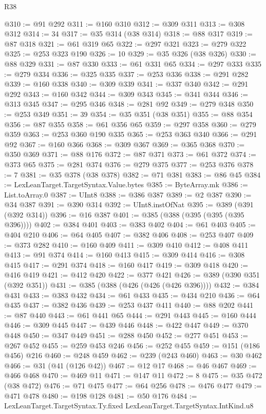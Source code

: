 \begin{lexlean}{R38}
\begin{coremodule}
@310 := @91 @292
@311 := @160 @310
@312 := @309 @311
@313 := @308 @312
@314 := 34
@317 := @35 @314 (@38 @314)
@318 := @88 @317
@319 := @87 @318
@321 := @61 @319 @65
@322 := @297 @321
@323 := @279 @322
@325 := @253 @323 @190
@326 := 10
@329 := @35 @326 (@38 @326)
@330 := @88 @329
@331 := @87 @330
@333 := @61 @331 @65
@334 := @297 @333
@335 := @279 @334
@336 := @325 @335
@337 := @253 @336
@338 := @291 @282
@339 := @160 @338
@340 := @309 @339
@341 := @337 @340
@342 := @291 @292
@343 := @160 @342
@344 := @309 @343
@345 := @341 @344
@346 := @313 @345
@347 := @295 @346
@348 := @281 @92
@349 := @279 @348
@350 := @253 @349
@351 := 39
@354 := @35 @351 (@38 @351)
@355 := @88 @354
@356 := @87 @355
@358 := @61 @356 @65
@359 := @297 @358
@360 := @279 @359
@363 := @253 @360 @190 @335
@365 := @253 @363 @340
@366 := @291 @92
@367 := @160 @366
@368 := @309 @367
@369 := @365 @368
@370 := @350 @369
@371 := @88 @176
@372 := @87 @371
@373 := @61 @372
@374 := @373 @65
@375 := @281 @374
@376 := @279 @375
@377 := @253 @376
@378 := 7
@381 := @35 @378 (@38 @378)
@382 := @71 @381
@383 := @86 @45
@384 := LexLeanTarget.TargetSyntax.Value.bytes
@385 := ByteArray.mk
@386 := List.toArray.{0}
@387 := UInt8
@388 := @386 @387
@389 := @2 @387
@390 := @34 @387
@391 := @390 @314
@392 := UInt8.instOfNat
@395 := @389 (@391 (@392 @314))
@396 := @16 @387
@401 := @385 (@388 (@395 (@395 (@395 @396))))
@402 := @384 @401
@403 := @383 @402
@404 := @61 @403
@405 := @404 @210
@406 := @64 @405
@407 := @382 @406
@408 := @253 @407
@409 := @373 @282
@410 := @160 @409
@411 := @309 @410
@412 := @408 @411
@413 := @91 @374
@414 := @160 @413
@415 := @309 @414
@416 := @308 @415
@417 := @291 @374
@418 := @160 @417
@419 := @309 @418
@420 := @416 @419
@421 := @412 @420
@422 := @377 @421
@426 := @389 (@390 @351 (@392 @351))
@431 := @385 (@388 (@426 (@426 (@426 @396))))
@432 := @384 @431
@433 := @383 @432
@434 := @61 @433
@435 := @434 @210
@436 := @64 @435
@437 := @382 @436
@439 := @253 @437 @411
@440 := @88 @202
@441 := @87 @440
@443 := @61 @441 @65
@444 := @291 @443
@445 := @160 @444
@446 := @309 @445
@447 := @439 @446
@448 := @422 @447
@449 := @370 @448
@450 := @347 @449
@451 := @288 @450
@452 := @277 @451
@453 := @267 @452
@455 := @259 @453 @246
@456 := @252 @455
@459 := @151 (@186 @456) @216
@460 := @248 @459
@462 := @239 (@243 @460)
@463 := @30 @462
@466 := @31 (@41 (@126 @42))
@467 := @12 @17
@468 := @46 @467
@469 := @466 @468
@470 := @469 @11
@471 := @147 @11
@472 := 8
@475 := @35 @472 (@38 @472)
@476 := @71 @475
@477 := @64 @256
@478 := @476 @477
@479 := @471 @478
@480 := @198 @128
@481 := @50 @176
@484 := LexLeanTarget.TargetSyntax.Ty.fixed LexLeanTarget.TargetSyntax.IntKind.u8

\end{coremodule}
\end{lexlean}
